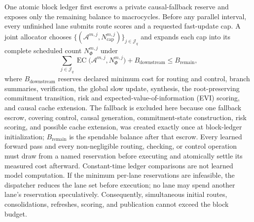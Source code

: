 \documentclass[10pt,a4paper]{article}
\newcommand{\EC}{\operatorname{EC}}
\newcommand{\Acal}{\mathcal{A}}
\newcommand{\Jcal}{\mathcal{J}}
\begin{document}
One atomic block ledger first escrows a private causal-fallback reserve and
exposes only the remaining balance to macrocycles. Before any parallel
interval, every unfinished lane submits route scores and a requested
fast-update cap. A joint allocator chooses
$\{(\Acal^{m,j}, N^{m,j}_{\mathrm{cap}})\}_{j \in \Jcal_q}$ and expands each
cap into its complete scheduled count $N^{m,j}_\Phi$ under
\begin{equation}
\sum_{j \in \Jcal_q} \EC\bigl(\Acal^{m,j}, N^{m,j}_\Phi\bigr)
+ B_{\mathrm{downstream}} \le B_{\mathrm{remain}},
\label{eq:budget}
\end{equation}
where $B_{\mathrm{downstream}}$ reserves declared minimum cost for routing and
control, branch summaries, verification, the global slow update, synthesis, the
root-preserving commitment transition, risk and expected-value-of-information
(EVI) scoring, and causal cache extension. The fallback is excluded here
because one fallback escrow, covering control, causal generation,
commitment-state construction, risk scoring, and possible cache extension, was
created exactly once at block-ledger initialization; $B_{\mathrm{remain}}$ is
the spendable balance after that escrow. Every learned forward pass and every
non-negligible routing, checking, or control operation must draw from a named
reservation before executing and atomically settle its measured cost
afterward. Constant-time ledger comparisons are not learned model computation.
If the minimum per-lane reservations are infeasible, the dispatcher reduces the
lane set before execution; no lane may spend another lane's reservation
speculatively. Consequently, simultaneous initial routes, consolidations,
refreshes, scoring, and publication cannot exceed the block budget.
\end{document}

